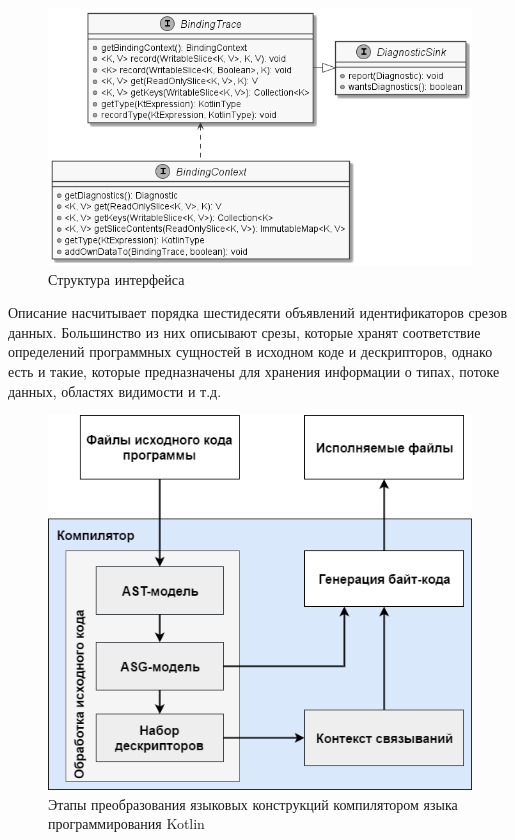 \begin{figure}[htbp]
    \centering
    \includegraphics[width=\textwidth]{resources/06/04_binding_context.png}
    \caption{Структура интерфейса }
    \label{fig:binding-trace-scheme}
\end{figure}

Описание  насчитывает порядка шестидесяти объявлений идентификаторов срезов данных. Большинство из них описывают срезы, которые хранят соответствие определений программных сущностей в исходном коде и дескрипторов, однако есть и такие, которые предназначены для хранения информации о типах, потоке данных, областях видимости и т.д. 

\begin{figure}[htbp]
    \centering
    \includegraphics[width=\textwidth]{resources/06/04_compiler_flow_diagram.png}
    \caption{Этапы преобразования языковых конструкций компилятором языка программирования Kotlin}
    \label{fig:binding-trace-scheme}
\end{figure}

